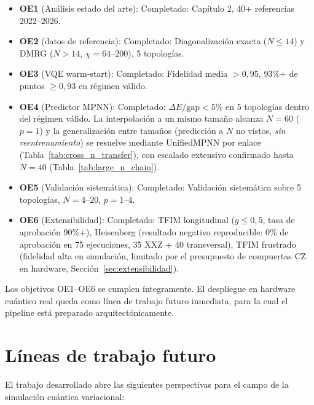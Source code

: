 \documentclass[11pt,a4paper,spanish]{book}
\begin{document}
\begin{itemize}
    \item \textbf{OE1} (Análisis estado del arte): Completado: Capítulo 2, 40+ referencias 2022--2026.
    \item \textbf{OE2} (datos de referencia): Completado: Diagonalización exacta ($N \leq 14$) y DMRG ($N > 14$, $\chi = 64$--$200$), 5 topologías.
    \item \textbf{OE3} (VQE warm-start): Completado: Fidelidad media $> 0,95$, 93\%+ de puntos $\geq 0,93$ en régimen válido.
    \item \textbf{OE4} (Predictor MPNN): Completado: $\Delta E/\text{gap} < 5\%$ en 5 topologías dentro del régimen válido. La interpolación a un mismo tamaño alcanza $N = 60$ ($p = 1$) y la generalización entre tamaños (predicción a $N$ no vistos, \emph{sin reentrenamiento}) se resuelve mediante UnifiedMPNN por enlace (Tabla~\ref{tab:cross_n_transfer}), con escalado extensivo confirmado hasta $N = 40$ (Tabla~\ref{tab:large_n_chain}).
    \item \textbf{OE5} (Validación sistemática): Completado: Validación sistemática sobre 5 topologías, $N = 4$--$20$, $p = 1$--$4$.
    \item \textbf{OE6} (Extensibilidad): Completado: TFIM longitudinal ($g \leq 0,5$, tasa de aprobación 90\%+), Heisenberg (resultado negativo reproducible: 0\% de aprobación en 75 ejecuciones, 35 XXZ + 40 transversal), TFIM frustrado (fidelidad alta en simulación, limitado por el presupuesto de compuertas CZ en hardware, Sección~\ref{sec:extensibilidad}).
\end{itemize}

Los objetivos OE1--OE6 se cumplen íntegramente. El despliegue en hardware cuántico real queda como línea de trabajo futuro inmediata, para la cual el pipeline está preparado arquitectónicamente.

\section{Líneas de trabajo futuro}

El trabajo desarrollado abre las siguientes perspectivas para el campo de la simulación cuántica variacional:
\end{document}
